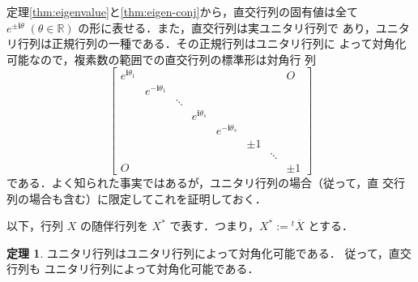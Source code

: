 \documentclass[11pt, uplatex, dvipdfmx, titlepage]{jsarticle}
\renewcommand{\i}{\mathbf{i}}
\renewcommand{\bar}[1]{\overline{#1}}
\theoremstyle{definition}
\newtheorem{theorem}{定理}[section]
\begin{document}
定理\ref{thm:eigenvalue}と\ref{thm:eigen-conj}から，直交行列の固有値は全て$e^{\pm \i \theta} \;
(\theta \in \mathbb{R})$ の形に表せる．また，直交行列は実ユニタリ行列で
あり，ユニタリ行列は正規行列の一種である．その正規行列はユニタリ行列に
よって対角化可能なので，複素数の範囲での直交行列の標準形は対角行
列
\begin{equation}\label{eq:diag}
\left[
  \begin{array}{cccccccc}
    e^{\i\theta_1} & & & & & & & O\\
                           & e^{-\i\theta_1} & & & & & &\\
                           & & \ddots & & & & &\\
                           & & & e^{\i\theta_s} & & & &\\
                           & & & & e^{-\i\theta_s} & & &\\
                           & & & & & \pm 1 & &\\
                           & & & & & & \ddots & \\
    O & & & & & & & \pm 1
  \end{array}
\right]
\end{equation}
である．よく知られた事実ではあるが，ユニタリ行列の場合（従って，直
交行列の場合も含む）に限定してこれを証明しておく．

以下，行列 $X$ の随伴行列を $X^*$ で表す．つまり，$X^* := {}^{t}\bar{X}$ とする．

\begin{theorem}\label{thm:diag-by-unitary}
  ユニタリ行列はユニタリ行列によって対角化可能である． 従って，直交行列も
  ユニタリ行列によって対角化可能である．
\end{theorem}
\end{document}

